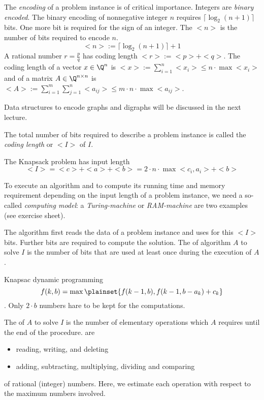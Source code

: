 The \emph{encoding} of a problem instance is of critical importance. Integers are \emph{binary encoded}. The binary encoding of nonnegative integer $n$ requires $\lceil \log_2(n+1) \rceil$ bits. One more bit is required for the sign of an integer. The  $<n>$ is the number of bits required to encode $n$.
\[
	<n>:=\lceil \log_2(n+1) \rceil + 1
\]
A rational number $r = \frac pq$ has coding length $<r> := <p> + <q>$.
The coding length of a vector $x \in \Q^n$ is $<x>:= \sum\limits_{i=1}^n<x_i> \leq n \cdot \max<  x_i >$ and of a matrix $A \in \Q^{n \times n}$ is $<A> := \sum\limits_{i=1}^m\sum\limits_{j=1}^n<a_{ij}> \leq m \cdot n \cdot\max< a_{ij} >$.

Data structures to encode graphs and digraphs will be discussed in the next lecture.

The total number of bits required to describe a problem instance is called the \emph{coding length} or  $<I>$ of $I$.

\begin{xmp+}
	The Knapsack problem has input length \[
		<I> = <c> + <a> + <b> = 2 \cdot n \cdot \max<c_i, a_i> + <b>
	\]
\end{xmp+}

To execute an algorithm and to compute its running time and memory requirement depending on the input length of a problem instance, we need a so-called \emph{computing model}: a \emph{Turing-machine} or \emph{RAM-machine} are two examples (see exercise sheet).
	
The algorithm first reads the data of a problem instance and uses for this $<I>$ bits. Further bits are required to compute the solution. The  of algorithm $A$ to solve $I$ is the number of bits that are used at least once during the execution of $A$.

\begin{xmp+}
	Knapsac dynamic programming \[
		f(k,b) = \max \plainset{f(k-1,b), f(k-1, b-a_k) + c_k}
	\]. Only $2 \cdot b$ numbers hare to be kept for the computations.
\end{xmp+}

The  of $A$ to solve $I$ is the number of elementary operations which $A$ requires until the end of the procedure.  are
\begin{itemize}
	\item reading, writing, and deleting
	\item adding, subtracting, multiplying, dividing and comparing
\end{itemize}
of rational (integer) numbers. Here, we estimate each operation with respect to the maximum numbers involved.

